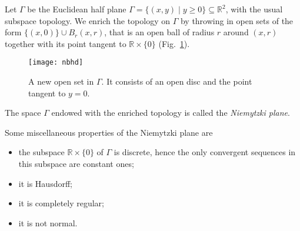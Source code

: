 \documentclass[12pt]{article}
\def\sse{\subseteq}
\def\R{\mathbb{R}}
\begin{document}
Let $\Gamma$ be the Euclidean half plane $\Gamma =\{(x,y)\mid y\ge0\}\sse\R^2$,
with the usual subspace topology. We enrich the topology on $\Gamma$ by throwing
in open sets of the form $\{(x,0)\}\cup B_r(x,r)$, that is an open ball of radius
$r$ around $(x,r)$ together with its point tangent to $\R\times\{0\}$
(Fig.~\ref{nbhd}).
\begin{figure}[h]
\begin{center}
  \texttt{[image: nbhd]}
  \caption{A new open set in $\Gamma$. It consists of an open
    disc and the point tangent to $y=0$.\label{nbhd}}
\end{center}
\end{figure}
The space $\Gamma$ endowed with the enriched topology is called the
\emph{Niemytzki plane}.

Some miscellaneous properties of the Niemytzki plane are
\begin{itemize}
\item the subspace $\R\times\{0\}$ of $\Gamma$ is discrete, hence
  the only convergent sequences in this subspace are constant ones;
\item it is Hausdorff;
\item it is completely regular;
\item it is not normal.
\end{itemize}
\end{document}
